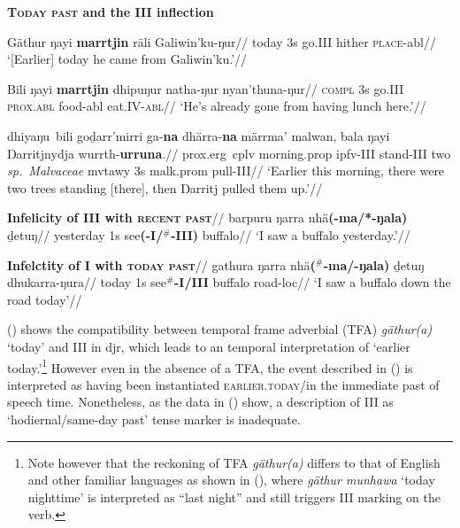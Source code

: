 \pex \textbf{\textsc{Today past} and the \gls{III} inflection}


\a{}\begingl\gla Gäthur ŋayi \textbf{marrtjin} räli Galiwin'ku-ŋur//
\glb today 3s go.\gls{III} hither \textsc{place}-\gls{abl}//
\glft`[Earlier] today he came from Galiwin'ku.'//\endgl

\a{}\begingl\gla Bili ŋayi \textbf{marrtjin} dhipuŋur natha-ŋur nyan'thuna-ŋur//
\glb \textsc{compl} 3s go.\gls{III} \textsc{prox.abl} food-\gls{abl} eat.\gls{IV}-\textsc{abl}//
\glft`He's already gone from having lunch here.'//\endgl

\a\begingl\gla dhiyaŋu~bili goḏarr'mirri ga-\textbf{na} dhärra-\textbf{na} märrma' malwan, bala ŋayi Ŋarritjnydja wurrth-\textbf{urruna}.//
\glb \gls{prox}.\gls{erg}~\gls{cplv} morning.\gls{prop} \gls{ipfv}-\gls{III} stand-\gls{III} two \textit{sp.~Malvaceae} \gls{mvtawy} 3s \gls{malk}.\gls{prom} pull-\gls{III}//
\glft`Earlier this morning, there were two trees standing [there], then Ŋarritj pulled them up.'\trailingcitation{[DB~20190405]}//\endgl

\a\begingl\glpreamble \textbf{Infelicity of \gls{III} with \textsc{recent past}}//
\gla barpuru ŋarra nhä\textbf{(-ma/*-ŋala)} ḏetuŋ//
\glb yesterday 1s see\textbf{(-\gls{I}/$^\#$-\gls{III})} buffalo//
\glft`I saw a buffalo yesterday.'\trailingcitation[MD 20180802]//\endgl

\a\begingl\glpreamble\textbf{ Infelctity of \gls{I} with \textsc{today past}}//
\gla gathura ŋarra nhä\textbf{($^\#$-ma/-ŋala)} ḏetuŋ dhukarra-ŋura//
\glb today 1s see\textbf{$ ^\# $-\gls{I}/\gls{III}} buffalo road-\gls{loc}//
\glft `I saw a buffalo down the road today'\trailingcitation{[MD 20180802]}//
\endgl
\xe

\noindent() shows the compatibility between temporal frame adverbial (TFA) \textit{gäthur(a)} `today' and \gls{III} in \gls{djr}, which leads to an temporal interpretation of `earlier today.'\footnote{Note however that the reckoning of \gls{TFA} \textit{gäthur(a)} differs to that of English and other familiar languages as shown in (), where \textit{gäthur munhawa} `today nighttime' is interpreted as ``last night'' and still triggers \gls{III} marking on the verb.} However even in the absence of a \gls{TFA}, the event described in () is interpreted as having been instantiated \textsc{earlier.today}/in the immediate past of speech time. Nonetheless, as the data in (\nextx) show, a description of \gls{III} as `hodiernal/same-day past' tense marker is inadequate.


